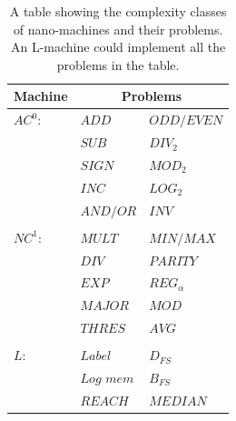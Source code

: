 \documentclass[10pt,sigconf]{acmart}
\begin{document}
\begin{table}[h!]
  \begin{tabular}{ p{1.5cm}|p{2cm} p{2cm}}
    \hline
    Machine & \multicolumn{2}{c}{Problems} \\
    \hline
    $AC^0$: & $ADD$ & $ODD/EVEN$  \\
            & $SUB$ & $DIV_{2}$  \\
            & $SIGN$ & $MOD_{2}$  \\
            & $INC$ & $LOG_{2}$  \\
            & $AND/OR$ & $INV$  \\
            &  &   \\
    $NC^1$:   & $MULT$ &$MIN/MAX$    \\
             & $DIV$ & $PARITY$  \\
             & $EXP$ & $REG_{\alpha}$  \\
             & $MAJOR$ & $MOD$  \\
             & $THRES$ & $AVG$  \\
             &  &   \\
    $L$:      &   $Label$ &$D_{FS}$      \\
             & $Log$ $mem$ & $B_{FS}$  \\
             & $REACH$ & $MEDIAN$  \\
            
    \hline 
  \end{tabular}\\
    
  \caption{A table showing the complexity classes of nano-machines and their problems. An L-machine could implement all the problems in the table.}
  \label{table1}
\end{table}
\end{document}
